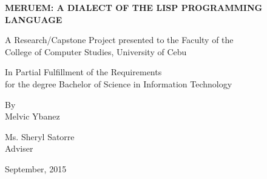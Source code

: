 \begin{titlepage}
	\begin{center}
		\vspace*{1cm}
		\large
		\uppercase{\textbf{MERUEM: A dialect of the Lisp programming language}}

		\vfill
		A Research/Capstone Project presented to the Faculty of the\\
		College of Computer Studies, University of Cebu
		
		\vfill
		In Partial Fulfillment of the Requirements\\
		for the degree Bachelor of Science in Information Technology
		
		\vfill
		By\\
		Melvic Ybanez
		
		\vfill
		Ms. Sheryl Satorre\\
		Adviser
		
		\vfill
		September, 2015
		
		\vspace*{1cm}
	\end{center}
\end{titlepage}